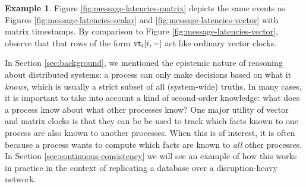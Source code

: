 \documentclass[]             %
{NASA}                       %
\theoremstyle{definition}
\newtheorem{example}[theorem]{Example}
\begin{document}
\begin{example}
  Figure \ref{fig:message-latencies-matrix} depicts the same events as
  Figures \ref{fig:message-latencies-scalar} and
  \ref{fig:message-latencies-vector} with matrix timestamps. By
  comparison to Figure \ref{fig:message-latencies-vector}, observe
  that that rows of the form $\textrm{vt}_i[i,-]$ act like ordinary vector
  clocks.
\end{example}

In Section \ref{sec:background}, we mentioned the epistemic nature of
reasoning about distributed systems: a process can only make decisions
based on what it \emph{knows}, which is usually a strict subset of all
(system-wide) truths. In many cases, it is important to take into
account a kind of second-order knowledge: what does a process know
about what other processes know? One major utility of vector and
matrix clocks is that they can be be used to track which facts known
to one process are also known to another processes. When this is of
interest, it is often because a process wants to compute which facts
are known to \emph{all} other processes. In Section
\ref{sec:continuous-consistency} we will see an example of how this
works in practice in the context of replicating a database over a
disruption-heavy network.

\end{document}
